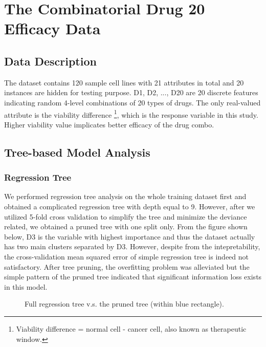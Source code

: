 \documentclass{article}
\begin{document}
\section{The Combinatorial Drug 20 Efficacy Data}
\label{combodrug}
\subsection{Data Description}

The dataset contains 120 sample cell lines with 21 attributes in total and 20 instances are hidden for testing purpose. D1, D2, ..., D20 are 20 discrete features indicating random 4-level combinations of 20 types of drugs. The only real-valued attribute is the viability difference \footnote{Viability difference = normal cell - cancer cell, also known as therapeutic window.}, which is the response variable in this study.  Higher viability value implicates better efficacy of the drug combo.

\subsection{Tree-based Model Analysis}
\subsubsection{Regression Tree}
We performed regression tree analysis on the whole training dataset first and obtained a complicated regression tree with depth equal to 9.
However, after we utilized 5-fold cross validation to simplify the tree and minimize the deviance related, we obtained a pruned tree with one split only.
From the figure shown below, D3 is the variable with highest importance and thus the dataset actually has two main clusters separated by D3. However, despite from the intepretability, the cross-validation mean squared error of simple regression tree is indeed not satisfactory. After tree pruning, the overfitting problem was alleviated but the simple pattern of the pruned tree indicated that significant information loss exists in this model. 



\begin{figure}[h]
  \centering
  \caption{Full regression tree v.s. the pruned tree (within blue rectangle).}
\end{figure}
\end{document}
